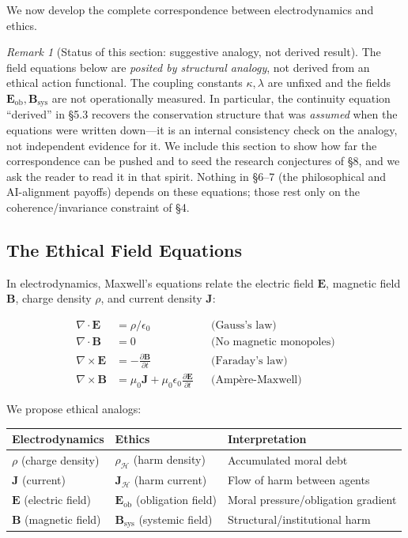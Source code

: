 \documentclass[12pt,letterpaper]{article}
\theoremstyle{definition}
\theoremstyle{remark}
\newtheorem{remark}[theorem]{Remark}
\newcommand{\harm}{\mathcal{H}}
\begin{document}
We now develop the complete correspondence between electrodynamics and ethics.

\begin{remark}[Status of this section: suggestive analogy, not derived result]
The field equations below are \emph{posited by structural analogy}, not derived from an ethical action functional. The coupling constants $\kappa,\lambda$ are unfixed and the fields $\mathbf{E}_\text{ob},\mathbf{B}_\text{sys}$ are not operationally measured. In particular, the continuity equation ``derived'' in \S5.3 recovers the conservation structure that was \emph{assumed} when the equations were written down---it is an internal consistency check on the analogy, not independent evidence for it. We include this section to show how far the correspondence can be pushed and to seed the research conjectures of \S8, and we ask the reader to read it in that spirit. Nothing in \S6--7 (the philosophical and AI-alignment payoffs) depends on these equations; those rest only on the coherence/invariance constraint of \S4.
\end{remark}

\subsection{The Ethical Field Equations}

In electrodynamics, Maxwell's equations relate the electric field $\mathbf{E}$, magnetic field $\mathbf{B}$, charge density $\rho$, and current density $\mathbf{J}$:

\begin{align}
\nabla \cdot \mathbf{E} &= \rho / \epsilon_0 && \text{(Gauss's law)} \\
\nabla \cdot \mathbf{B} &= 0 && \text{(No magnetic monopoles)} \\
\nabla \times \mathbf{E} &= -\frac{\partial \mathbf{B}}{\partial t} && \text{(Faraday's law)} \\
\nabla \times \mathbf{B} &= \mu_0 \mathbf{J} + \mu_0 \epsilon_0 \frac{\partial \mathbf{E}}{\partial t} && \text{(Amp\`{e}re-Maxwell)}
\end{align}

We propose ethical analogs:

\begin{center}
\begin{tabular}{lll}
\toprule
\textbf{Electrodynamics} & \textbf{Ethics} & \textbf{Interpretation} \\
\midrule
$\rho$ (charge density) & $\rho_\harm$ (harm density) & Accumulated moral debt \\
$\mathbf{J}$ (current) & $\mathbf{J}_\harm$ (harm current) & Flow of harm between agents \\
$\mathbf{E}$ (electric field) & $\mathbf{E}_\text{ob}$ (obligation field) & Moral pressure/obligation gradient \\
$\mathbf{B}$ (magnetic field) & $\mathbf{B}_\text{sys}$ (systemic field) & Structural/institutional harm \\
\bottomrule
\end{tabular}
\end{center}
\end{document}
